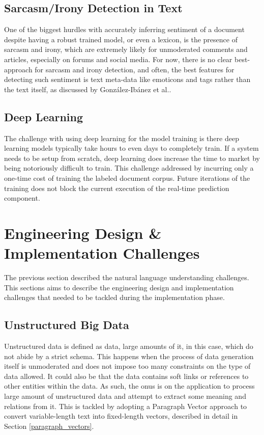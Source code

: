 \documentclass[conference]{IEEEtran}
\begin{document}
    \subsection{Sarcasm/Irony Detection in Text}
        One of the biggest hurdles with accurately inferring sentiment of a document despite having a robust trained model, or even a lexicon, is the presence of sarcasm and irony, which are extremely likely for unmoderated comments and articles, especially on forums and social media. 
        For now, there is no clear best-approach for sarcasm and irony detection, and often, the best features for detecting such sentiment is text meta-data like emoticons and tags rather than the text itself, as discussed by Gonz{\'a}lez-Ib{\'a}nez et al.\cite{gonzalez2011identifying}.

    \subsection{Deep Learning}
        The challenge with using deep learning for the model training is there deep learning models typically take hours to even days to completely train. 
        If a system needs to be setup from scratch, deep learning does increase the time to market by being notoriously difficult to train. 
        This challenge addressed by incurring only a one-time cost of training the labeled document corpus. Future iterations of the training does not block the current execution of the real-time prediction component.

\vspace{5mm}

\section{Engineering Design \& Implementation Challenges}
    The previous section described the natural language understanding challenges. This sections aims to describe the engineering design and implementation challenges that needed to be tackled during the implementation phase.

    \subsection{Unstructured Big Data}
        Unstructured data is defined as data, large amounts of it, in this case, which do not abide by a strict schema\cite{buneman1996query}. 
        This happens when the process of data generation itself is unmoderated and does not impose too many constraints on the type of data allowed. 
        It could also be that the data contains soft links or references to other entities within the data. 
        As such, the onus is on the application to process large amount of unstructured data and attempt to extract some meaning and relations from it.
        This is tackled by adopting a Paragraph Vector approach to convert variable-length text into fixed-length vectors, described in detail in Section \ref{paragraph_vectors}.
\end{document}
